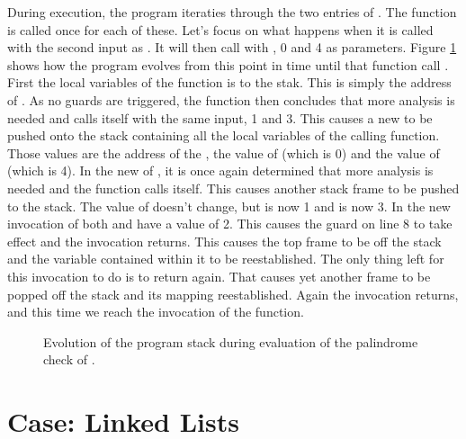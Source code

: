 During execution, the program iteraties through the two entries of . The  function is called once for each of these. Let's focus on what happens when it is called with the second input as . It will then call  with , 0 and 4 as parameters. Figure \ref{fig:fun:palindrome:stack} shows how the program  evolves from this point in time until that function call . First the local variables of the  function is  to the stak. This is simply the address of . As no guards are triggered, the  function then concludes that more analysis is needed and calls itself with the same input, 1 and 3. This causes a new  to be pushed onto the stack containing all the local variables of the calling function. Those values are the address of the , the value of  (which is 0) and the value of  (which is 4). In the new  of , it is once again determined that more analysis is needed and the function calls itself. This causes another stack frame to be pushed to the stack. The value of  doesn't change, but  is now 1 and  is now 3. In the new invocation of  both  and  have a value of 2. This causes the guard on line 8 to take effect and the invocation returns. This causes the top frame to be  off the stack and the variable  contained within it to be reestablished. The only thing left for this invocation to do is to return again. That causes yet another frame to be popped off the stack and its mapping reestablished. Again the invocation returns, and this time we reach the invocation of the  function.

\begin{figure}[tbp]
  
  \caption{Evolution of the program stack during evaluation of the palindrome check of \protect{}.}
  \label{fig:fun:palindrome:stack}
\end{figure}

\section{Case: Linked Lists}
\label{sec:fun:linkedlist}

